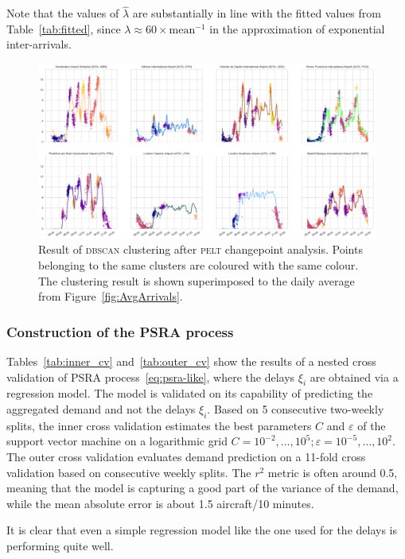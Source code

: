 \documentclass[final,review]{elsarticle}
\newcommand{\PELT}{\textsc{pelt}}
\newcommand{\DBSCAN}{\textsc{dbscan}}
\begin{document}
\begin{rmk}
	Note that the values of \(\hat{\lambda}\) are substantially in line with the fitted values from Table~\ref{tab:fitted}, since \(\lambda \approx 60 \times \text{mean}^{-1}\) in the approximation of exponential inter-arrivals.
\end{rmk}

\begin{figure}
    \includegraphics[width=\textwidth]{DDPoisson}
    \caption{Result of \DBSCAN{} clustering after \PELT{} changepoint analysis. Points belonging to the same clusters are coloured with the same colour. The clustering result is shown superimposed to the daily average from Figure~\ref{fig:AvgArrivals}.}\label{fig:poisson_segmentation}
\end{figure}

\subsubsection{Construction of the \acs{PSRA} process}\label{sec:psra}

Tables~\ref{tab:inner_cv} and~\ref{tab:outer_cv} show the results of a nested cross validation of \ac{PSRA} process~\eqref{eq:psra-like}, where the delays \(\xi_i\) are obtained via a regression model.
The model is validated on its capability of predicting the aggregated demand and not the delays \(\xi_i\).
Based on 5 consecutive two-weekly splits, the inner cross validation estimates the best parameters \(C\) and \(\varepsilon\) of the support vector machine on a logarithmic grid \(C = 10^{-2},\ldots, 10^5; \varepsilon = 10^{-5},\dots,10^2\).
The outer cross validation evaluates demand prediction on a 11-fold cross validation based on consecutive weekly splits.
The \(r^2\) metric is often around 0.5, meaning that the model is capturing a good part of the variance of the demand, while the mean absolute error is about 1.5 aircraft/10 minutes.
\begin{kpt}
  It is clear that even a simple regression model like the one used for the delays is performing quite well.
\end{kpt}
\end{document}
